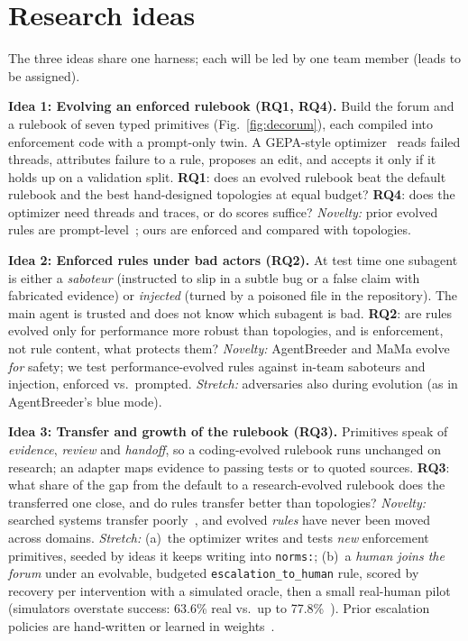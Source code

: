 \documentclass{article}
\newcommand{\RQ}[1]{\textbf{RQ#1}}
\begin{document}
\section{Research ideas}

The three ideas share one harness; each will be led by one team member (leads to be assigned).

\textbf{Idea 1: Evolving an enforced rulebook (\RQ{1}, \RQ{4}).}
Build the forum and a rulebook of seven typed primitives (Fig.~\ref{fig:decorum}), each compiled into enforcement code with a prompt-only twin.
A GEPA-style optimizer~\citep{agrawal2026gepa} reads failed threads, attributes failure to a rule, proposes an edit, and accepts it only if it holds up on a validation split.
\RQ{1}: does an evolved rulebook beat the default rulebook and the best hand-designed topologies at equal budget?
\RQ{4}: does the optimizer need threads and traces, or do scores suffice? \emph{Novelty:} prior evolved rules are prompt-level~\citep{hao2026evolve,kumar2026evolving}; ours are enforced and compared with topologies.

\textbf{Idea 2: Enforced rules under bad actors (\RQ{2}).}
At test time one subagent is either a \emph{saboteur} (instructed to slip in a subtle bug or a false claim with fabricated evidence) or \emph{injected} (turned by a poisoned file in the repository).
The main agent is trusted and does not know which subagent is bad.
\RQ{2}: are rules evolved only for performance more robust than topologies, and is enforcement, not rule content, what protects them?
\emph{Novelty:} AgentBreeder and MaMa evolve \emph{for} safety; we test performance-evolved rules against in-team saboteurs and injection, enforced vs.\ prompted. \emph{Stretch:} adversaries also during evolution (as in AgentBreeder's blue mode).

\textbf{Idea 3: Transfer and growth of the rulebook (\RQ{3}).}
Primitives speak of \emph{evidence}, \emph{review} and \emph{handoff}, so a coding-evolved rulebook runs unchanged on research; an adapter maps evidence to passing tests or to quoted sources.
\RQ{3}: what share of the gap from the default to a research-evolved rulebook does the transferred one close, and do rules transfer better than topologies? \emph{Novelty:} searched systems transfer poorly~\citep{huang2026manta,so2026superficial}, and evolved \emph{rules} have never been moved across domains.
\emph{Stretch:} (a)~the optimizer writes and tests \emph{new} enforcement primitives, seeded by ideas it keeps writing into \texttt{norms:}; (b)~a \emph{human joins the forum} under an evolvable, budgeted \texttt{escalation\_to\_human} rule, scored by recovery per intervention with a simulated oracle, then a small real-human pilot (simulators overstate success: 63.6\% real vs.\ up to 77.8\%~\citep{zhou2026mind}). Prior escalation policies are hand-written or learned in weights~\citep{mozannar2025magentic,yang2026adaptive,feng2024large}.
\end{document}

